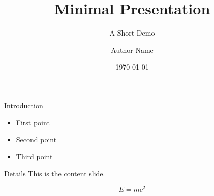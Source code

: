 \documentclass[doctype=beamer]{omnilatex}
\title{Minimal Presentation}
\subtitle{A Short Demo}
\author{Author Name}
\date{\today}
\begin{document}
\begin{frame}
  \titlepage
\end{frame}

\begin{frame}{Introduction}
  \begin{itemize}
    \item First point
    \item Second point
    \item Third point
  \end{itemize}
\end{frame}

\begin{frame}{Details}
  This is the content slide.

  \begin{equation}
    E = mc^2
  \end{equation}
\end{frame}
\end{document}
